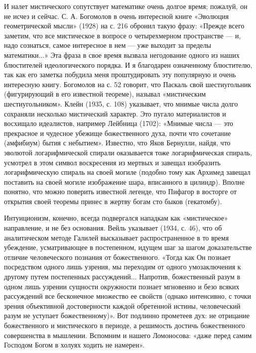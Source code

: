 И  налет  мистического  сопутствует  математике  очень  долгое  время;
пожалуй, он  не исчез  и сейчас.  С. А.  Богомолов в  очень интересной
книге  «Эволюция  геометрической  мысли»  (1928)  на  с.  216  обронил
такую   фразу:  «Прежде   всего   заметим,  что   все  мистическое   в
вопросе  о четырехмерном  пространстве  --- и,  надо сознаться,  самое
интересное  в  нем  ---  уже выходит  за  пределы  математики...»  Эта
фраза в  свое время  вызвала негодование  одного из  наших блюстителей
идеологического порядка.  И я  благодарен означенному  блюстителю, так
как  его  заметка  побудила   меня  проштудировать  эту  популярную  и
очень  интересную  книгу. Богомолов  на  с.  52 говорит,  что  Паскаль
свой  шестиугольник (фигурирующий  в его  известной теореме),  называл
«мистическим  шестиугольником». Клейн  (1935, с.  108) указывает,  что
мнимые  числа  долго  сохраняли несколько  мистический  характер.  Это
пугало материалистов и восхищало идеалистов, например Лейбница (1702):
«Мнимые  числа ---  это  прекрасное и  чудесное убежище  божественного
духа, почти что сочетание (амфибиум)  бытия с небытием». Известно, что
Яков Бернулли, найдя, что эволютой логарифмической спирали оказывается
тоже  логарифмическая  спираль,  усмотрел в  этом  символ  воскресения
из  мертвых  и завещал  изобразить  логарифмическую  спираль на  своей
могиле (подобно  тому как  Архимед завещал  поставить на  своей могиле
изображение  шара, вписанного  в цилиндр).  Вполне понятно,  что можно
поверить известной легенде,  что Пифагор в восторге  от открытия своей
теоремы принес в жертву богам сто быков (гекатомбу).

Интуиционизм, конечно,  всегда подвергался нападкам  как «мистическое»
направление,  и  не без  основания.  Вейль  указывает (1934,  с.  46),
что  об аналитическом  методе Галилей  высказывает распространенное  в
то  время  убеждение,  усматривающее  в  постепенном,  идущем  шаг  за
шагом доказательстве отличие  человеческого познания от божественного.
«Тогда   как  Он   познает   посредством  одного   лишь  узрения,   мы
переходим  от   одного  умозаключения  к  другому   путем  постепенных
рассуждений...  Напротив,  божественный  разум в  одном  лишь  узрении
сущности окружности  познает мгновенно  и безо всяких  рассуждений все
бесконечное множество  ее свойств  (однако интенсивно, с  точки зрения
объективной  достоверности  каждой   обретенной  истины,  человеческий
разум  не уступает  божественному)».  Вот подлинно  прометеев дух:  не
отрицание божественного и мистического  в периоде, а решимость достичь
божественного совершенства  в мышлении. Вспомним и  нашего Ломоносова:
«даже перед самим Господом Богом в холуях ходить не намерен».


